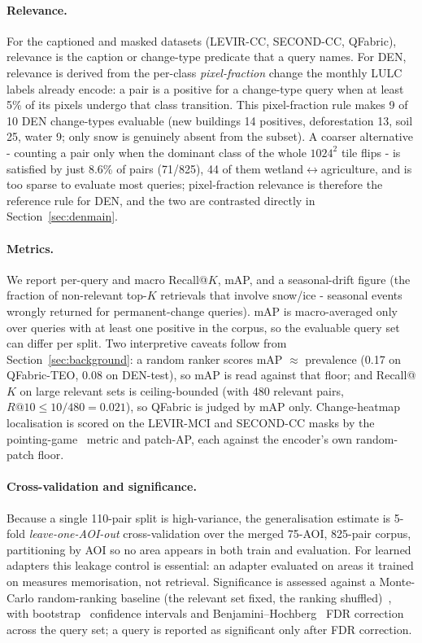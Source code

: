 \documentclass{article}
\begin{document}
\paragraph{Relevance.}
For the captioned and masked datasets (LEVIR-CC, SECOND-CC, QFabric), relevance
is the caption or change-type predicate that a query names. For DEN, relevance is
derived from the per-class \emph{pixel-fraction} change the monthly LULC labels
already encode: a pair is a positive for a change-type query when at least 5\% of
its pixels undergo that class transition. This pixel-fraction rule makes 9 of 10
DEN change-types evaluable (new buildings 14 positives, deforestation 13, soil
25, water 9; only snow is genuinely absent from the subset). A coarser
alternative - counting a pair only when the dominant class of the whole
$1024^2$ tile flips - is satisfied by just 8.6\% of pairs (71/825), 44 of them
wetland$\leftrightarrow$agriculture, and is too sparse to evaluate most queries;
pixel-fraction relevance is therefore the reference rule for DEN, and the two are
contrasted directly in Section~\ref{sec:denmain}.

\paragraph{Metrics.}
We report per-query and macro Recall@$K$, mAP, and a seasonal-drift figure (the
fraction of non-relevant top-$K$ retrievals that involve snow/ice - seasonal
events wrongly returned for permanent-change queries). mAP is macro-averaged only
over queries with at least one positive in the corpus, so the evaluable query set
can differ per split. Two interpretive caveats follow from
Section~\ref{sec:background}: a random ranker scores mAP $\approx$ prevalence
(0.17 on QFabric-TEO, 0.08 on DEN-test), so mAP is read against that floor; and
Recall@$K$ on large relevant sets is ceiling-bounded (with 480 relevant pairs,
$R@10 \le 10/480 = 0.021$), so QFabric is judged by mAP only. Change-heatmap
localisation is scored on the LEVIR-MCI and SECOND-CC masks by the
pointing-game~\cite{pointinggame} metric and patch-AP, each against the encoder's
own random-patch floor.

\paragraph{Cross-validation and significance.}
Because a single 110-pair split is high-variance, the generalisation estimate is
5-fold \emph{leave-one-AOI-out} cross-validation over the merged 75-AOI,
825-pair corpus, partitioning by AOI so no area appears in both train and
evaluation. For learned adapters this leakage control is essential: an adapter
evaluated on areas it trained on measures memorisation, not retrieval.
Significance is assessed against a Monte-Carlo random-ranking baseline (the
relevant set fixed, the ranking shuffled)~\cite{permtest}, with
bootstrap~\cite{bootstrap} confidence intervals and
Benjamini--Hochberg~\cite{benjaminihochberg} FDR correction across the query
set; a query is reported as significant only after FDR correction.
\end{document}
